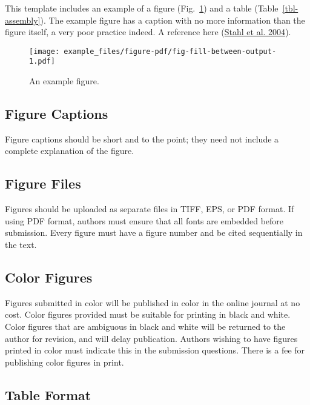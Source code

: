 \documentclass[
  NewProceedings,
  letterpaper]{./assets/ascelike-new}
\begin{document}
This template includes an example of a figure
(Fig.~\ref{fig-fill-between}) and a table (Table~\ref{tbl-assembly}).
The example figure has a caption with no more information than the
figure itself, a very poor practice indeed. A reference here
(\protect\hyperlink{ref-Stahl:2004a}{Stahl et al. 2004}).

\begin{figure}

{\centering \texttt{[image: example\_files/figure-pdf/fig-fill-between-output-1.pdf]}

}

\caption{\label{fig-fill-between}An example figure.}

\end{figure}

\hypertarget{figure-captions}{%
\subsection{Figure Captions}\label{figure-captions}}

Figure captions should be short and to the point; they need not include
a complete explanation of the figure.

\hypertarget{figure-files}{%
\subsection{Figure Files}\label{figure-files}}

Figures should be uploaded as separate files in TIFF, EPS, or PDF
format. If using PDF format, authors must ensure that all fonts are
embedded before submission. Every figure must have a figure number and
be cited sequentially in the text.

\hypertarget{color-figures}{%
\subsection{Color Figures}\label{color-figures}}

Figures submitted in color will be published in color in the online
journal at no cost. Color figures provided must be suitable for printing
in black and white. Color figures that are ambiguous in black and white
will be returned to the author for revision, and will delay publication.
Authors wishing to have figures printed in color must indicate this in
the submission questions. There is a fee for publishing color figures in
print.

\hypertarget{table-format}{%
\subsection{Table Format}\label{table-format}}
\end{document}
